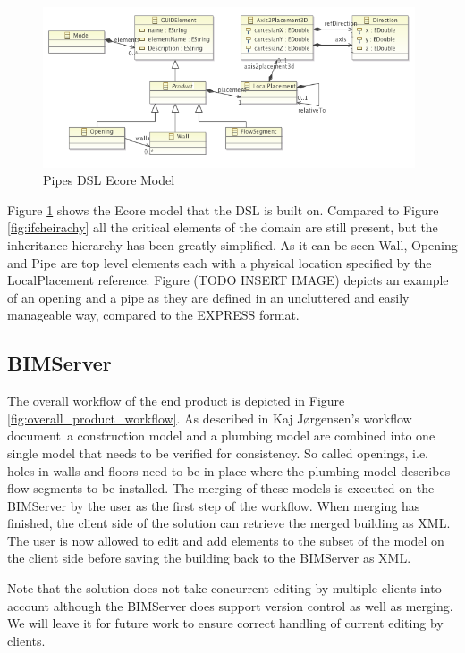 \begin{figure}[t]
    \centering
        \includegraphics[width=110mm]{images/PipesEcoreModel.png}
    \caption{Pipes DSL Ecore Model}
    \label{fig:pipes_dsl_ecore_model}
\end{figure}

Figure \ref{fig:pipes_dsl_ecore_model} shows the Ecore model that the DSL is built on. Compared to Figure \ref{fig:ifcheirachy} all the critical elements of the domain are still present, but the inheritance hierarchy has been greatly simplified. As it can be seen Wall, Opening and Pipe are top level elements each with a physical location specified by the LocalPlacement reference. Figure (TODO INSERT IMAGE) depicts an example of an opening and a pipe as they are defined in an uncluttered and easily manageable way, compared to the EXPRESS format.

\subsection{BIMServer}
The overall workflow of the end product is depicted in Figure \ref{fig:overall_product_workflow}. As described in Kaj Jørgensen's workflow document\,\cite{jorgensen12} a construction model and a plumbing model are combined into one single model that needs to be verified for consistency. So called openings, i.e. holes in walls and floors need to be in place where the plumbing model describes flow segments to be installed. The merging of these models is executed on the BIMServer by the user as the first step of the workflow. When merging has finished, the client side of the solution can retrieve the merged building as XML. The user is now allowed to edit and add elements to the subset of the model on the client side before saving the building back to the BIMServer as XML.

Note that the solution does not take concurrent editing by multiple clients into account although the BIMServer does support version control as well as merging. We will leave it for future work to ensure correct handling of current editing by clients.

